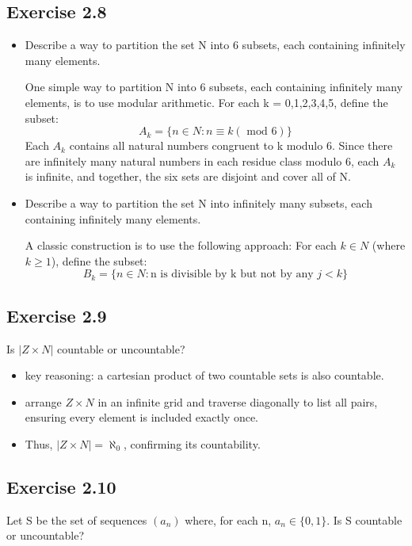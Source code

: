 \documentclass[12pt]{article}
\begin{document}
		\subsection*{Exercise 2.8}
			\begin{itemize}
				\item Describe a way to partition the set N into 6 subsets, each containing infinitely many elements.
					
					One simple way to partition N into 6 subsets, each containing infinitely many elements, is to use modular arithmetic. For each k = 0,1,2,3,4,5, define the subset:
					\begin{equation}
						A_k = \{n \in N: n \equiv k (\text{ mod } 6)\}
					\end{equation}
					Each $A_k$ contains all natural numbers congruent to k modulo 6. Since there are infinitely many natural numbers in each residue class modulo 6, each $A_k$ is infinite, and together, the six sets are disjoint and cover all of N.
				
				\item Describe a way to partition the set N into infinitely many subsets, each containing infinitely many elements.
				
					A classic construction is to use the following approach: For each $k \in N$ (where $k \ge 1$), define the subset:
					\begin{equation}
						B_k = \{n \in N: \text{n is divisible by k but not by any $j < k$}\}
					\end{equation}
			\end{itemize}
		\subsection*{Exercise 2.9}
			Is $|Z \times N|$ countable or uncountable?
			
			\begin{itemize}
				\item key reasoning: a cartesian product of two countable sets is also countable.
				\item arrange $Z \times N$ in an infinite grid and traverse diagonally to list all pairs, ensuring every element is included exactly once.
				\item Thus, $|Z \times N| = \aleph_0$, confirming its countability.
			\end{itemize}
		\subsection*{Exercise 2.10}
			Let S be the set of sequences $(a_n)$ where, for each n, $a_n \in \{0, 1\}$. Is S countable or uncountable?
			
\end{document}
